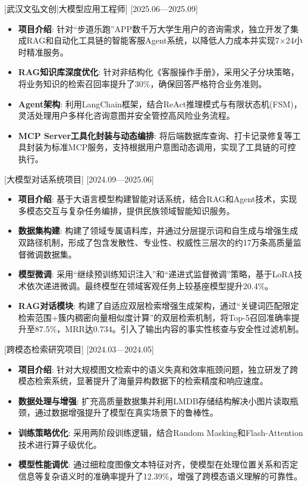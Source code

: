 \documentclass{resume}
\begin{document}
[武汉文弘文创|大模型应用工程师]
[2025.06—2025.09]

\begin{itemize}
  \item \textbf{项目介绍}: 针对“步道乐跑”APP数千万大学生用户的咨询需求，独立开发了集成RAG和自动化工具链的智能客服Agent系统，以降低人力成本并实现7×24小时精准服务。
  \item \textbf{RAG知识库深度优化}: 针对非结构化《客服操作手册》，采用父子分块策略，将业务知识的检索召回率提升了30\%，确保回答严格符合业务准则。
  \item \textbf{Agent架构}: 利用LangChain框架，结合ReAct推理模式与有限状态机(FSM)，灵活处理用户多样化咨询意图并安全管控高风险业务流程。
  \item \textbf{MCP Server工具化封装与动态编排}: 将后端数据库查询、打卡记录修复等工具封装为标准MCP服务，支持根据用户意图动态调用，实现了工具链的可控执行。
\end{itemize}


[大模型对话系统项目]
[2024.09—2025.06]

\begin{itemize}
  \item \textbf{项目介绍}: 基于大语言模型构建智能对话系统，结合RAG和Agent技术，实现多模态交互与复杂任务编排，提供民族领域智能知识服务。
  \item \textbf{数据集构建}: 构建了领域专属语料库，并通过分层提示词和自生成与增强生成双路径机制，形成了包含发散性、专业性、权威性三层次的约17万条高质量监督微调数据集。
  \item \textbf{模型微调}: 采用“继续预训练知识注入”和“递进式监督微调”策略，基于LoRA技术依次递进微调。最终模型在领域客观任务上较基座模型提升20.4\%。
  \item \textbf{RAG对话模块}: 构建了自适应双层检索增强生成架构，通过“关键词匹配限定检索范围+簇内稠密向量相似度计算”的双层检索机制，将Top-5召回准确率提升至87.5\%，MRR达0.734。引入了输出内容的事实性核查与安全性过滤机制。
\end{itemize}

[跨模态检索研究项目]
[2024.03—2024.05]

\begin{itemize}
  \item \textbf{项目介绍}: 针对大规模图文检索中的语义失真和效率瓶颈问题，独立研发了跨模态检索系统，显著提升了海量异构数据下的检索精度和响应速度。
  \item \textbf{数据处理与增强}: 扩充高质量数据集并利用LMDB存储结构解决小图片读取瓶颈，通过数据增强提升了模型在真实场景下的鲁棒性。
  \item \textbf{训练策略优化}: 采用两阶段训练逻辑，结合Random Masking和Flash-Attention技术进行算子级优化。
  \item \textbf{模型性能调优}: 通过细粒度图像文本特征对齐，使模型在处理位置关系和否定信息等复杂语义时的准确率提升了12.39\%，增强了跨模态语义理解的可靠性。
\end{itemize}
\end{document}
